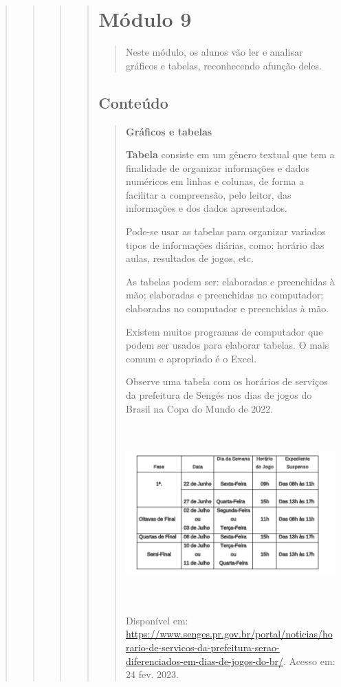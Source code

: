 \begin{quote}
\begin{quote}
\begin{quote}
\begin{quote}
\section{Módulo 9}\label{muxf3dulo-9}

\begin{quote}
Neste módulo, os alunos vão ler e analisar gráficos e tabelas,
reconhecendo afunção deles.
\end{quote}

\subsection{Conteúdo}\label{conteuxfado-8}

\begin{quote}
\textbf{Gráficos e tabelas}

\textbf{Tabela} consiste em um gênero textual que tem a finalidade de
organizar informações e dados numéricos em linhas e colunas, de forma a
facilitar a compreensão, pelo leitor, das informações e dos dados
apresentados.

Pode-se usar as tabelas para organizar variados tipos de informações
diárias, como: horário das aulas, resultados de jogos, etc.

As tabelas podem ser: elaboradas e preenchidas à mão; elaboradas e
preenchidas no computador; elaboradas no computador e preenchidas à mão.

Existem muitos programas de computador que podem ser usados para
elaborar tabelas. O mais comum e apropriado é o Excel.

Observe uma tabela com os horários de serviços da prefeitura de Sengés
nos dias de jogos do Brasil na Copa do Mundo de 2022.

\includegraphics[width=4.56744in,height=2.66667in]{media/image28.png}

Disponível em:
\url{https://www.senges.pr.gov.br/portal/noticias/horario-de-servicos-da-prefeitura-serao-diferenciados-em-dias-de-jogos-do-br/}.
Acesso em: 24 fev. 2023.


\end{quote}
\end{quote}
\end{quote}
\end{quote}
\end{quote}
